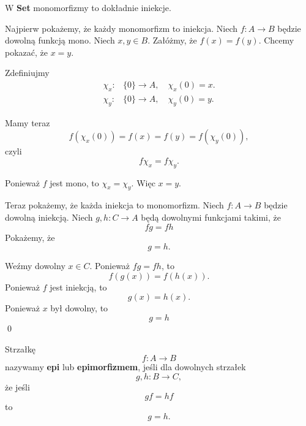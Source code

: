 \begin{example}
	W \textbf{Set} monomorfizmy to dokładnie iniekcje.

	Najpierw pokażemy, że każdy monomorfizm to iniekcja.
	Niech $f: A \to B$ będzie dowolną funkcją mono.
	Niech $x, y \in B$.
	Załóżmy,
	że $f(x) = f(y)$.
	Chcemy pokazać,
	że $x = y$.

	Zdefiniujmy
	\begin{align}
		\chi_x:& \{0\} \to A, \quad \chi_x(0) = x. \\
		\chi_y:& \{0\} \to A, \quad \chi_y(0) = y.
	\end{align}

	Mamy teraz
	\begin{equation}
		f(\chi_x(0)) = f(x) = f(y) = f(\chi_y(0)),
	\end{equation}
	czyli
	\begin{equation}
		f \chi_x = f \chi_y.
	\end{equation}

	Ponieważ $f$ jest mono,
	to $\chi_x = \chi_y$.
	Więc $x = y$.

	Teraz pokażemy, że każda iniekcja to monomorfizm.
	Niech $f: A \to B$ będzie dowolną iniekcją.
	Niech $g,h: C \to A$ będą dowolnymi funkcjami takimi, że
	\begin{equation}
		fg = fh
	\end{equation}
	Pokażemy, że
	\begin{equation}
		g = h.
	\end{equation}

	Weźmy dowolny $x \in C$.
	Ponieważ $fg = fh$, to
	\begin{equation}
		f(g(x)) = f(h(x)).
	\end{equation}
	Ponieważ $f$ jest iniekcją, to
	\begin{equation}
		g(x) = h(x).
	\end{equation}
	Ponieważ $x$ był dowolny, to
	\begin{equation}
		g = h
	\end{equation}
	\qed
\end{example}

\begin{definition}
	Strzałkę
	\begin{equation}
		f: A \to B
	\end{equation}
	nazywamy \textbf{epi} lub \textbf{epimorfizmem}, jeśli dla dowolnych strzałek
	\begin{equation}
		g, h: B \to C,
	\end{equation}
	że jeśli
	\begin{equation}
		gf = hf
	\end{equation}
	to
	\begin{equation}
		g = h.
	\end{equation}
\end{definition}

